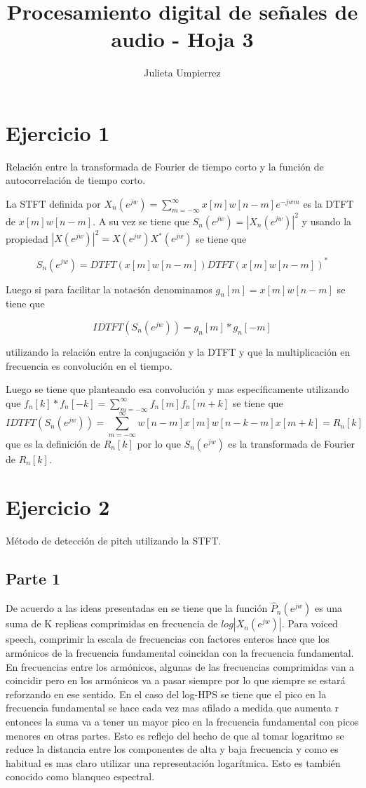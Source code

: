 \documentclass[a4paper]{article}
\title{Procesamiento digital de señales de audio - Hoja 3}
\author{Julieta Umpierrez}
\date{\vspace{-5ex}}
\begin{document}
\maketitle

\section{Ejercicio 1 }
Relación entre la transformada de Fourier de tiempo corto y la función de autocorrelación de tiempo corto.

La STFT definida por $X_n(e^{jw}) = \sum_{m=-\infty}^{\infty}x[m]w[n-m]e^{-jwm}$ es la DTFT de $x[m]w[n-m]$. A su vez se tiene que $S_n(e^{jw}) = |X_n(e^{jw})|^2$ y usando la propiedad $|X(e^{jw})|^2 = X(e^{jw})X^*(e^{jw})$ se tiene que

$$S_n(e^{jw}) = DTFT(x[m]w[n-m])DTFT(x[m]w[n-m])^*$$

Luego si para facilitar la notación denominamos $g_n[m] = x[m]w[n-m]$ se tiene que 

$$IDTFT(S_n(e^{jw})) = g_n[m]*g_n[-m]$$ 

utilizando la relación entre la conjugación y la DTFT y que la multiplicación en frecuencia es convolución en el tiempo. 

Luego se tiene que planteando esa convolución y mas específicamente utilizando que $f_n[k]*f_n[-k] =\sum_{m=-\infty}^{\infty} f_n[m]f_n[m+k]$ se tiene que 
$$IDTFT(S_n(e^{jw})) = \sum_{m=-\infty}^{\infty}w[n-m]x[m]w[n-k-m]x[m+k] =  R_n[k]$$
que es la definición de $R_n[k]$ por lo que $S_n(e^{jw})$ es la transformada de Fourier de $R_n[k]$.

\section{Ejercicio 2}
Método de detección de pitch utilizando la STFT.

\subsection{Parte 1}
De acuerdo a las ideas presentadas en \cite{RS1} se tiene que la función $\hat{P}_n(e^{jw})$ es una suma de K replicas comprimidas en frecuencia de $log|X_n(e^{jw})|$. Para voiced speech, comprimir la escala de frecuencias con factores enteros hace que los armónicos de la frecuencia fundamental coincidan con la frecuencia fundamental. En frecuencias entre los armónicos, algunas de las frecuencias comprimidas van a coincidir pero en los armónicos va a pasar siempre por lo que siempre se estará reforzando en ese sentido. En el caso del log-HPS se tiene que el pico en la frecuencia fundamental se hace cada vez mas afilado a medida que aumenta r entonces la suma va a tener un mayor pico en la frecuencia fundamental con picos menores en otras partes. Esto es reflejo del hecho de que al tomar logaritmo se reduce la distancia entre los componentes de alta y baja frecuencia y como es habitual es mas claro utilizar una representación logarítmica. Esto es también conocido como blanqueo espectral.
\end{document}
